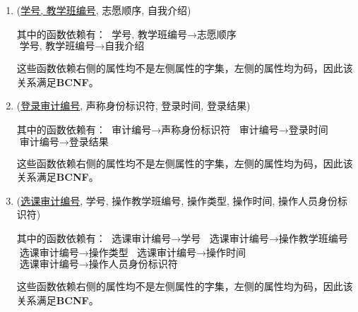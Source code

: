 \begin{enumerate}
    \item (\uline{学号, 教学班编号}, 志愿顺序, 自我介绍) \par
    其中的函数依赖有： \newline
    $\text{学号, 教学班编号} \rightarrow \text{志愿顺序}$ \newline
    $\text{学号, 教学班编号} \rightarrow \text{自我介绍}$ \par
    这些函数依赖右侧的属性均不是左侧属性的字集，左侧的属性均为码，因此该关系满足\textbf{BCNF}。
    
    \item (\uline{登录审计编号}, 声称身份标识符, 登录时间, 登录结果) \par
    其中的函数依赖有： \newline
    $\text{审计编号} \rightarrow \text{声称身份标识符}$ \newline
    $\text{审计编号} \rightarrow \text{登录时间}$ \newline
    $\text{审计编号} \rightarrow \text{登录结果}$ \par
    这些函数依赖右侧的属性均不是左侧属性的字集，左侧的属性均为码，因此该关系满足\textbf{BCNF}。
    
    \item (\uline{选课审计编号}, 学号, 操作教学班编号, 操作类型, 操作时间, 操作人员身份标识符) \par
    其中的函数依赖有： \newline
    $\text{选课审计编号} \rightarrow \text{学号}$ \newline
    $\text{选课审计编号} \rightarrow \text{操作教学班编号}$ \newline
    $\text{选课审计编号} \rightarrow \text{操作类型}$ \newline
    $\text{选课审计编号} \rightarrow \text{操作时间}$ \newline
    $\text{选课审计编号} \rightarrow \text{操作人员身份标识符}$ \par
    这些函数依赖右侧的属性均不是左侧属性的字集，左侧的属性均为码，因此该关系满足\textbf{BCNF}。
    
\end{enumerate}
